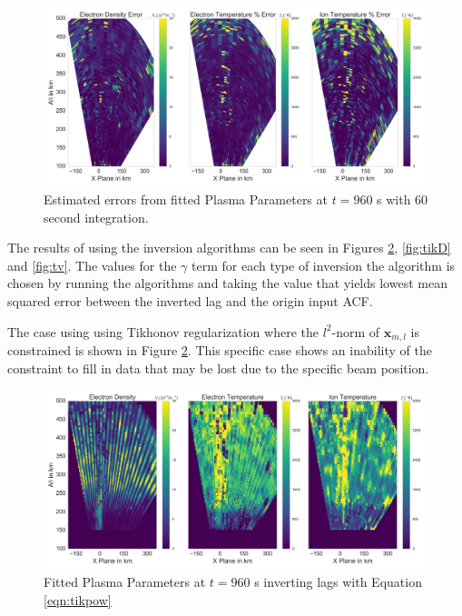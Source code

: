 \begin{figure}[!ht]
\centering
\includegraphics[width=6in]{0960_60_int_err}
\caption{Estimated errors from fitted Plasma Parameters at $t=960$ s with 60 second integration.}
\label{fig:fplparamst60errinv}
\end{figure}

The results of using the inversion algorithms can be seen in Figures \ref{fig:tikpow}, \ref{fig:tikD} and \ref{fig:tv}. The values for the $\gamma$ term for each type of inversion the algorithm is chosen by running the algorithms and taking the value that yields lowest mean squared error between the inverted lag and the origin input ACF. 

The case using using Tikhonov regularization where the $l^2$-norm of $\mathbf{x}_{m,l}$ is constrained is shown in Figure \ref{fig:tikpow}. This specific case shows an inability of the constraint to fill in data that may be lost due to the specific beam position. 

\begin{figure}[!ht]
\centering
\includegraphics[width=6in]{tikfitted}
\caption{Fitted Plasma Parameters at $t=960$ s inverting lags with Equation \ref{eqn:tikpow}}
\label{fig:tikpow}
\end{figure}

